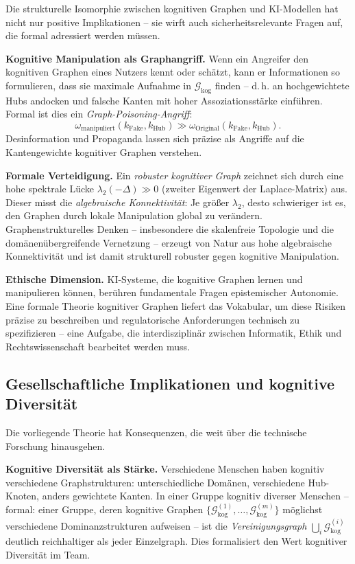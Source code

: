 ﻿\documentclass[12pt,a4paper]{article}
\theoremstyle{plain}
\theoremstyle{definition}
\theoremstyle{remark}
\newcommand{\GG}{\mathcal{G}}
\begin{document}
Die strukturelle Isomorphie zwischen kognitiven Graphen und KI-Modellen hat nicht nur positive Implikationen -- sie wirft auch sicherheitsrelevante Fragen auf, die formal adressiert werden müssen.

\textbf{Kognitive Manipulation als Graphangriff.} Wenn ein Angreifer den kognitiven Graphen eines Nutzers kennt oder schätzt, kann er Informationen so formulieren, dass sie maximale Aufnahme in $\GG_{\text{kog}}$ finden -- d.\,h. an hochgewichtete Hubs andocken und falsche Kanten mit hoher Assoziationsstärke einführen. Formal ist dies ein \emph{Graph-Poisoning-Angriff}:
\[
  \omega_{\text{manipuliert}}(k_{\text{Fake}}, k_{\text{Hub}}) \gg \omega_{\text{Original}}(k_{\text{Fake}}, k_{\text{Hub}}).
\]
Desinformation und Propaganda lassen sich präzise als Angriffe auf die Kantengewichte kognitiver Graphen verstehen.

\textbf{Formale Verteidigung.} Ein \emph{robuster kognitiver Graph} zeichnet sich durch eine hohe spektrale Lücke $\lambda_2(-\Delta) \gg 0$ (zweiter Eigenwert der Laplace-Matrix) aus. Dieser misst die \emph{algebraische Konnektivität}: Je größer $\lambda_2$, desto schwieriger ist es, den Graphen durch lokale Manipulation global zu verändern. Graphenstrukturelles Denken -- insbesondere die skalenfreie Topologie und die domänenübergreifende Vernetzung -- erzeugt von Natur aus hohe algebraische Konnektivität und ist damit strukturell robuster gegen kognitive Manipulation.

\textbf{Ethische Dimension.} KI-Systeme, die kognitive Graphen lernen und manipulieren können, berühren fundamentale Fragen epistemischer Autonomie. Eine formale Theorie kognitiver Graphen liefert das Vokabular, um diese Risiken präzise zu beschreiben und regulatorische Anforderungen technisch zu spezifizieren -- eine Aufgabe, die interdisziplinär zwischen Informatik, Ethik und Rechtswissenschaft bearbeitet werden muss.

\subsection{Gesellschaftliche Implikationen und kognitive Diversität}
\label{subsec:gesellschaft}

Die vorliegende Theorie hat Konsequenzen, die weit über die technische Forschung hinausgehen.

\textbf{Kognitive Diversität als Stärke.} Verschiedene Menschen haben kognitiv verschiedene Graphstrukturen: unterschiedliche Domänen, verschiedene Hub-Knoten, anders gewichtete Kanten. In einer Gruppe kognitiv diverser Menschen -- formal: einer Gruppe, deren kognitive Graphen $\{\GG_{\text{kog}}^{(1)}, \ldots, \GG_{\text{kog}}^{(m)}\}$ möglichst verschiedene Dominanzstrukturen aufweisen -- ist die \emph{Vereinigungsgraph} $\bigcup_i \GG_{\text{kog}}^{(i)}$ deutlich reichhaltiger als jeder Einzelgraph. Dies formalisiert den Wert kognitiver Diversität im Team.
\end{document}

